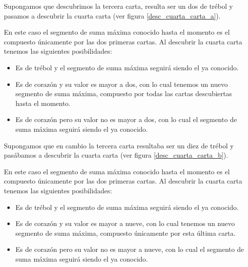 \documentclass[12pt, a4paper, openany, fleqn]{book}
\newif\ifUsePstPoker
\begin{document}
    Supongamos que descubrimos la tercera carta, resulta ser un dos de trébol y pasamos a descubrir la cuarta carta (ver figura \ref{desc_cuarta_carta_a}).

    \ifUsePstPoker
        \begin{figure}[h]
            \centering
            \psset{framebg=beige}\crdsevh
            \psset{framebg=beige}\crdtwoh
            \psset{framebg=beige}\crdtwoc
            \psset{backcolor=red}\crdback
            \rput(-1.4,-1){\textbf{\^}} %

            \caption{Descubriendo la cuarta carta, con suma positiva} \label{desc_cuarta_carta_a}
        \end{figure}
    \fi

    \noindent En este caso el segmento de suma máxima conocido hasta el momento es el compuesto únicamente por las dos primeras cartas. Al descubrir la cuarta carta tenemos las siguientes posibilidades:
    \begin{itemize}
        \item Es de trébol y el segmento de suma máxima seguirá siendo el ya conocido.
        \item Es de corazón y su valor es mayor a dos, con lo cual tenemos un nuevo segmento de suma máxima, compuesto por todas las cartas descubiertas hasta el momento.
        \item Es de corazón pero su valor no es mayor a dos, con lo cual el segmento de suma máxima seguirá siendo el ya conocido.
    \end{itemize} 

    Supongamos que en cambio la tercera carta resultaba ser un diez de trébol y pasábamos a descubrir la cuarta carta (ver figura \ref{desc_cuarta_carta_b}).

    \ifUsePstPoker
        \begin{figure}[h]
            \centering
            \psset{framebg=beige}\crdsevh
            \psset{framebg=beige}\crdtwoh
            \psset{framebg=beige}\crdtenc
            \psset{backcolor=red}\crdback
            \rput(-1.4,-1){\textbf{\^}} %

            \caption{Descubriendo la cuarta carta, con suma negativa} \label{desc_cuarta_carta_b}
        \end{figure}
    \fi

    \noindent En este caso el segmento de suma máxima conocido hasta el momento es el compuesto únicamente por las dos primeras cartas. Al descubrir la cuarta carta tenemos las siguientes posibilidades:
    \begin{itemize}
        \item Es de trébol y el segmento de suma máxima seguirá siendo el ya conocido.
        \item Es de corazón y su valor es mayor a nueve, con lo cual tenemos un nuevo segmento de suma máxima, compuesto únicamente por esta última carta.
        \item Es de corazón pero su valor no es mayor a nueve, con lo cual el segmento de suma máxima seguirá siendo el ya conocido.
    \end{itemize}
\end{document}
